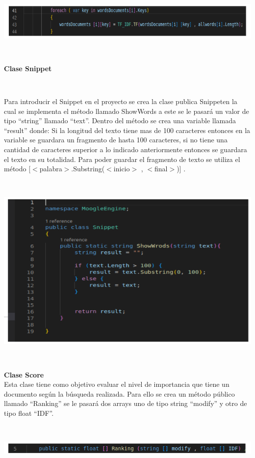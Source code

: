\documentclass{article}
\begin{document}
{\

\centering
\includegraphics[height = 1.6 cm ]{Captura desde 2023-07-18 22-28-47.png}

\

\textbf{\large Clase Snippet }

\

Para introducir el Snippet en el proyecto se crea la clase publica Snippeten la cual se implementa el método llamado ShowWords a este se le pasará
un valor de tipo “string” llamado “text”. Dentro del método se crea una variable llamada “result” donde: Si la longitud del texto tiene mas de 
100 caracteres entonces en la variable se guardara un fragmento de hasta 100 caracteres, si no tiene una cantidad de caracteres superior a lo indicado 
anteriormente entonces se guardara el texto en su totalidad. Para poder guardar el fragmento de texto se utiliza el método [$<$palabra$>$.Substring($<$inicio$>$ , $<$final$>$)] .

\

\centering
\includegraphics[height = 7.2 cm ]{Captura desde 2023-07-18 22-37-53.png}

\

\textbf{\large Clase Score }\\
Esta clase tiene como objetivo evaluar el nivel de importancia que tiene un documento según la búsqueda realizada. Para ello se crea un método público llamado “Ranking” 
se le pasará dos arrays uno de tipo string  “modify” y otro de tipo float  “IDF”.

\

\centering
\includegraphics[height = 0.6 cm ]{Captura desde 2023-07-18 22-44-15.png}

}
\end{document}
